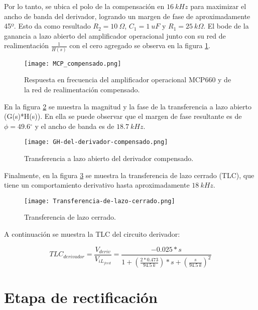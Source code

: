 Por lo tanto, se ubica el polo de la compensación en $16\:kHz$ para maximizar el ancho de banda del derivador, logrando un margen de fase de aproximadamente 45º. Esto da como resultado $R_2=10\:\Omega$, $C_1=1\:uF$ y $R_1=25\: k\Omega$. El bode de la ganancia a lazo abierto del amplificador operacional junto con su red de realimentación $\frac{1}{H(s)}$ con el cero agregado se observa en la figura \ref{fig:img_MCP_compensado}.

\begin{figure}[H]
	\centering
	\texttt{[image: MCP\_compensado.png]}
	\caption{Respuesta en frecuencia del amplificador operacional MCP660 y de la red de realimentación compensado.}
	\label{fig:img_MCP_compensado}
\end{figure}

En la figura \ref{fig:img_GH del derivador compensado} se muestra la magnitud y la fase de la transferencia a lazo abierto (G(s)*H(s)). En ella se puede observar que el margen de fase resultante es de $\phi =49.6{}^\circ $ y el ancho de banda es de $18.7\:kHz$.

\begin{figure}[H]
	\centering
	\texttt{[image: GH-del-derivador-compensado.png]}
	\caption{Transferencia a lazo abierto del derivador compensado.}
	\label{fig:img_GH del derivador compensado}
\end{figure}

Finalmente, en la figura \ref{fig:img_Transferencia-de-lazo-cerrado} se muestra la transferencia de lazo cerrado (TLC), que tiene un comportamiento derivativo hasta aproximadamente $18 \:kHz$. 


\begin{figure}[H]
	\centering
	\texttt{[image: Transferencia-de-lazo-cerrado.png]}
	\caption{Transferencia de lazo cerrado.}
	\label{fig:img_Transferencia-de-lazo-cerrado}
\end{figure}


A continuación se muestra la TLC del circuito derivador:

\begin{equation} \label{eq_TLC_derivador}
	{TLC}_{derivador}=\frac{V_{deriv}}{V_{iL_{feed}}}=\frac{-0.025*s}{1+(\frac{2*0.473}{94.5\: k})*s+(\frac{s}{94.5\:k})^2}
\end{equation} 

\section{Etapa de rectificación}

